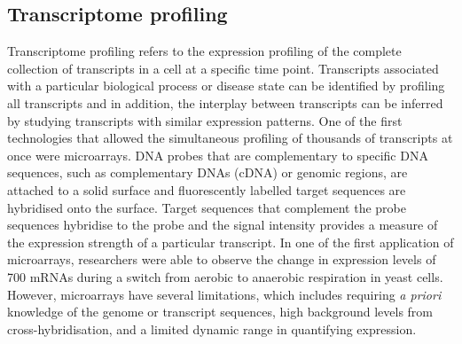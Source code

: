 \subsection{Transcriptome profiling}

Transcriptome profiling refers to the expression profiling of the complete collection of transcripts in a cell at a specific time point. Transcripts associated with a particular biological process or disease state can be identified by profiling all transcripts and in addition, the interplay between transcripts can be inferred by studying transcripts with similar expression patterns. One of the first technologies that allowed the simultaneous profiling of thousands of transcripts at once were microarrays\cite{pmid7569999}. DNA probes that are complementary to specific DNA sequences, such as complementary DNAs (cDNA) or genomic regions, are attached to a solid surface and fluorescently labelled target sequences are hybridised onto the surface. Target sequences that complement the probe sequences hybridise to the probe and the signal intensity provides a measure of the expression strength of a particular transcript. In one of the first application of microarrays, researchers were able to observe the change in expression levels of 700 mRNAs during a switch from aerobic to anaerobic respiration in yeast cells\cite{pmid9381177}. However, microarrays have several limitations, which includes requiring \textit{a priori} knowledge of the genome or transcript sequences, high background levels from cross-hybridisation\cite{pmid16749918}, and a limited dynamic range in quantifying expression.

